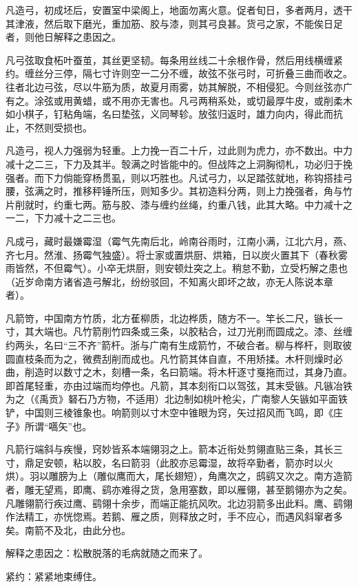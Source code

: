 \documentclass[12pt,UTF8]{ctexbook}
\begin{document}
凡造弓，初成坯后，安置室中梁阁上，地面勿离火意。促者旬日，多者两月，透干其津液，然后取下磨光，重加筋、胶与漆，则其弓良甚。货弓之家，不能俟日足者，则他日解释之患因之。

凡弓弦取食柘叶蚕茧，其丝更坚韧。每条用丝线二十余根作骨，然后用线横缠紧约。缠丝分三停，隔七寸许则空一二分不缠，故弦不张弓时，可折叠三曲而收之。往者北边弓弦，尽以牛筋为质，故夏月雨雾，妨其解脱，不相侵犯。今则丝弦亦广有之。涂弦或用黄蜡，或不用亦无害也。凡弓两稍系处，或切最厚牛皮，或削柔木如小棋子，钉粘角端，名曰垫弦，义同琴轸。放弦归返时，雄力向内，得此而抗止，不然则受损也。

凡造弓，视人力强弱为轻重。上力挽一百二十斤，过此则为虎力，亦不数出。中力减十之二三，下力及其半。彀满之时皆能中的。但战阵之上洞胸彻札，功必归于挽强者。而下力倘能穿杨贯虱，则以巧胜也。凡试弓力，以足踏弦就地，称钩搭挂弓腰，弦满之时，推移秤锤所压，则知多少。其初造料分两，则上力挽强者，角与竹片削就时，约重七两。筋与胶、漆与缠约丝绳，约重八钱，此其大略。中力减十之一二，下力减十之二三也。

凡成弓，藏时最嫌霉湿（霉气先南后北，岭南谷雨时，江南小满，江北六月，燕、齐七月。然淮、扬霉气独盛）。将士家或置烘厨、烘箱，日以炭火置其下（春秋雾雨皆然，不但霉气）。小卒无烘厨，则安顿灶突之上。稍怠不勤，立受朽解之患也（近岁命南方诸省造弓解北，纷纷驳回，不知离火即坏之故，亦无人陈说本章者）。

凡箭笴，中国南方竹质，北方萑柳质，北边桦质，随方不一。竿长二尺，镞长一寸，其大端也。凡竹箭削竹四条或三条，以胶粘合，过刀光削而圆成之。漆、丝缠约两头，名曰“三不齐”箭杆。浙与广南有生成箭竹，不破合者。柳与桦杆，则取彼圆直枝条而为之，微费刮削而成也。凡竹箭其体自直，不用矫揉。木杆则燥时必曲，削造时以数寸之木，刻槽一条，名曰箭端。将木杆逐寸戛拖而过，其身乃直。即首尾轻重，亦由过端而均停也。凡箭，其本刻衔口以驾弦，其末受镞。凡镞冶铁为之（《禹贡》砮石乃方物，不适用）北边制如桃叶枪尖，广南黎人矢镞如平面铁铲，中国则三棱锥象也。响箭则以寸木空中锥眼为窍，矢过招风而飞鸣，即《庄子》所谓“嚆矢”也。

凡箭行端斜与疾慢，窍妙皆系本端翎羽之上。箭本近衔处剪翎直贴三条，其长三寸，鼎足安顿，粘以胶，名曰箭羽（此胶亦忌霉湿，故将卒勤者，箭亦时以火烘）。羽以雕膀为上（雕似鹰而大，尾长翅短），角鹰次之，鸱鹞又次之。南方造箭者，雕无望焉，即鹰、鹞亦难得之货，急用塞数，即以雁翎，甚至鹅翎亦为之矣。凡雕翎箭行疾过鹰、鹞翎十余步，而端正能抗风吹。北边羽箭多出此料。鹰、鹞翎作法精工，亦恍惚焉。若鹅、雁之质，则释放之时，手不应心，而遇风斜窜者多矣。南箭不及北，由此分也。

解释之患因之：松散脱落的毛病就随之而来了。

紧约：紧紧地束缚住。
\end{document}
